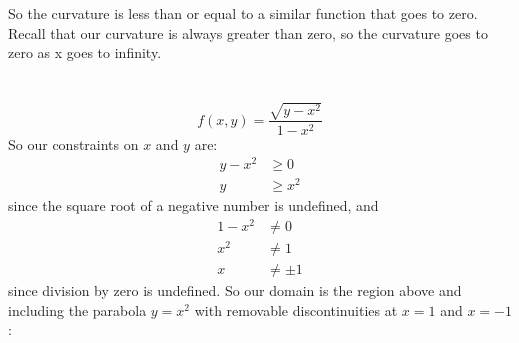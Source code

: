 \documentclass{article}
\begin{document}
	So the curvature is less than or equal to a similar function that goes to zero.
	Recall that our curvature is always greater than zero, so the curvature goes to
	zero as x goes to infinity.
\section{} %
	\[f(x,y)=\frac{\sqrt{y-x^2}}{1-x^2}\]
	So our constraints on $x$ and $y$ are:
	\begin{align*}
		y-x^2&\ge0\\
		y&\ge{x^2}
	\end{align*}
	since the square root of a negative number is undefined, and
	\begin{align*}
		1-x^2&\neq0\\
		x^2&\neq1\\
		x&\neq\pm1
	\end{align*}
	since division by zero is undefined.
	So our domain is the region above and including the parabola $y=x^2$ with removable discontinuities at
	$x=1$ and $x=-1$:\\\\
\end{document}
